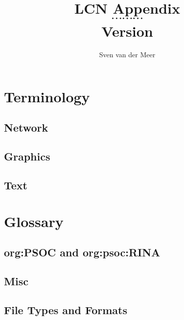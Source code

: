 \documentclass[a4paper,final,notitlepage]{article}
\newcommand{\lcnVersion}{}
\begin{document}
    \renewcommand*{\bibfont}{\citefont}
    \newcommand{\lcncite}[1]{{\citefont\cite{#1}}}

    \author{Sven van der Meer}
    \title{LCN Appendix \\ $\cdots \cdots \cdots$ \\ \small{Version \lcnVersion}}
    \maketitle

    \begin{multicols}{2}
        \setcounter{tocdepth}{3}
        \tableofcontents
    \end{multicols}
    \newpage


    \section{Terminology}
        \subsection{Network}
            
        \subsection{Graphics}
            
        \subsection{Text}
            

    \section{Glossary}
        \subsection{\acs{org:PSOC} and \acs{org:psoc:RINA}}
            

        \subsection{Misc}
            

        \subsection{File Types and Formats}
            
\end{document}
